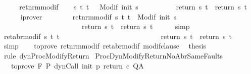 \begin{isabellebody}
%
\isadelimproof
%
\endisadelimproof
%
\isatagproof
{}\isamarkupfalse%
\ {\isacharminus}\isanewline
\ \ \isamarkupfalse%
\ ret{\isacharunderscore}nrm{\isacharunderscore}modif\isanewline
\ \ \isamarkupfalse%
\ {\isachardoublequoteopen}{\isasymforall}s\ t{\isachardot}\ t\ \ {\isasymin}\ {\isacharparenleft}Modif\ {\isacharparenleft}init\ s{\isacharparenright}{\isacharparenright}\ \isanewline
\ \ \ \ \ \ \ \ {\isasymlongrightarrow}\ return{\isacharprime}\ s\ t\ {\isacharequal}\ return\ s\ t{\isachardoublequoteclose}\isanewline
\ \ \ \ \isamarkupfalse%
\ iprover\isanewline
\ \ \isamarkupfalse%
\ \isanewline
\ \ \isamarkupfalse%
\ ret{\isacharunderscore}nrm{\isacharunderscore}modif{\isacharprime}{\isacharcolon}\ {\isachardoublequoteopen}{\isasymforall}s\ t{\isachardot}\ t\ {\isasymin}\ {\isacharparenleft}Modif\ {\isacharparenleft}init\ s{\isacharparenright}{\isacharparenright}\ \isanewline
\ \ \ \ \ \ \ \ \ \ \ \ \ \ \ \ \ \ \ \ \ \ {\isasymlongrightarrow}\ return{\isacharprime}\ s\ t\ {\isacharequal}\ return\ s\ t{\isachardoublequoteclose}\isanewline
\ \ \ \ \isamarkupfalse%
\ simp\isanewline
\ \ \isamarkupfalse%
\ ret{\isacharunderscore}abr{\isacharunderscore}modif{\isacharprime}{\isacharcolon}\ {\isachardoublequoteopen}{\isasymforall}s\ t{\isachardot}\ t\ {\isasymin}\ {\isacharbraceleft}{\isacharbraceright}\ \isanewline
\ \ \ \ \ \ \ \ \ \ \ \ \ \ \ \ \ \ \ \ \ \ \ \ {\isasymlongrightarrow}\ return{\isacharprime}\ s\ t\ {\isacharequal}\ return\ s\ t{\isachardoublequoteclose}\isanewline
\ \ \ \ \isamarkupfalse%
\ simp\isanewline
\ \ \isamarkupfalse%
\ to{\isacharunderscore}prove\ ret{\isacharunderscore}nrm{\isacharunderscore}modif{\isacharprime}\ ret{\isacharunderscore}abr{\isacharunderscore}modif{\isacharprime}\ modif{\isacharunderscore}clause\ \isamarkupfalse%
\ {\isacharquery}thesis\isanewline
\ \ \ \ \isamarkupfalse%
\ {\isacharparenleft}rule\ dynProcModifyReturn{\isacharparenright}\isanewline
{}\isamarkupfalse%
%
\endisatagproof
{\isafoldproof}%
%
\isadelimproof
\isanewline
%
\endisadelimproof
\isanewline
\isanewline
{}\isamarkupfalse%
\ ProcDynModifyReturnNoAbrSameFaults{\isacharcolon}\ \isanewline
\ \ \ to{\isacharunderscore}prove{\isacharcolon}\ {\isachardoublequoteopen}{\isasymGamma}{\isacharcomma}{\isasymTheta}{\isasymturnstile}\isactrlbsub {\isacharslash}F\isactrlesub \ P\ {\isacharparenleft}dynCall\ init\ p\ return{\isacharprime}\ c{\isacharparenright}\ Q{\isacharcomma}A{\isachardoublequoteclose}\isanewline

\end{isabellebody}
